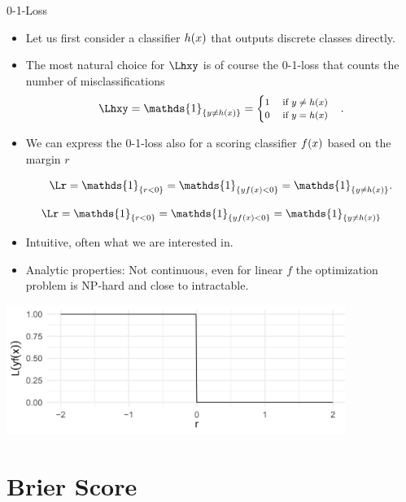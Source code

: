 \begin{vbframe}{0-1-Loss}

\begin{itemize}
  \item Let us first consider a classifier $h(x)$ that outputs discrete classes directly. 
  \item The most natural choice for $\Lhxy$ is of course the 0-1-loss that counts the number of misclassifications
  $$
  \Lhxy = \mathds{1}_{\{y \ne \hx\}} =
     \footnotesize \begin{cases} 1 \quad \text{ if } y \ne \hx \\ 0 \quad    \text{ if } y = \hx  \end{cases}.
  $$
  \item We can express the 0-1-loss also for a scoring classifier $f(x)$ based on the margin $r$

  $$
  \Lr = \mathds{1}_{\{r < 0\}} = \mathds{1}_{\{y\fx < 0\}} = \mathds{1}_{\{y \neq \hx\}}.
  $$

\end{itemize}


\framebreak 

$$
  \Lr = \mathds{1}_{\{r < 0\}} = \mathds{1}_{\{y\fx < 0\}} = \mathds{1}_{\{y \neq \hx\}} 
$$

\begin{itemize}
\item Intuitive, often what we are interested in.
\item Analytic properties:  Not continuous, even for linear $f$ the optimization problem is NP-hard and close to intractable.
\end{itemize}

\begin{center}
\includegraphics[width = 11cm ]{figure_man/0-1-loss.png} \\
\end{center}


\end{vbframe}


\section{Brier Score}


